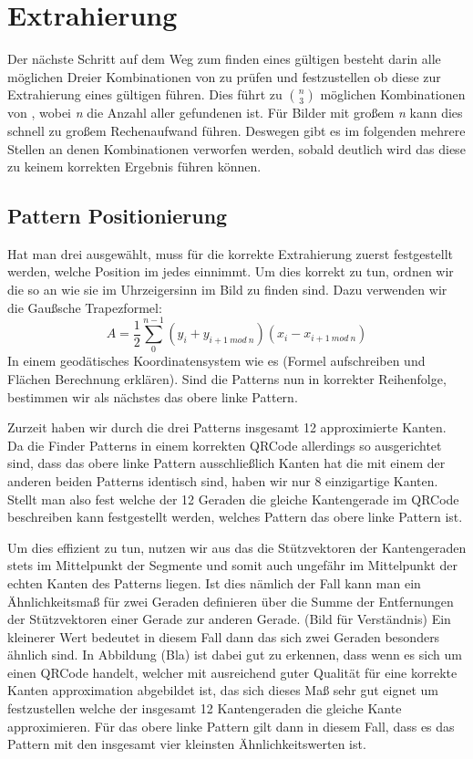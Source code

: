 \chapter{Extrahierung}

Der nächste Schritt auf dem Weg zum finden eines gültigen \QRCodes besteht darin alle möglichen Dreier Kombinationen von \fps zu prüfen und festzustellen ob diese zur Extrahierung eines gültigen \QRCodes führen. Dies führt zu $\binom{n}{3}$ möglichen Kombinationen von \fps, wobei \emph{n} die Anzahl aller gefundenen \fps ist. Für Bilder mit großem \emph{n} kann dies schnell zu großem Rechenaufwand führen. Deswegen gibt es im folgenden mehrere Stellen an denen Kombinationen verworfen werden, sobald deutlich wird das diese zu keinem korrekten Ergebnis führen können.

\section{Pattern Positionierung} 
Hat man drei \fps ausgewählt, muss für die korrekte Extrahierung zuerst festgestellt werden, welche Position im \QRCode jedes \fp einnimmt. Um dies korrekt zu tun, ordnen wir die \fps so an wie sie im Uhrzeigersinn im Bild zu finden sind. Dazu verwenden wir die Gaußsche Trapezformel:
$$ A=\frac{1}{2} \sum_{0}^{n-1} (y_i + y_{i+1\ mod\ n})(x_i - x_{i+1\ mod\ n}) $$
In einem geodätisches Koordinatensystem wie es 
 (Formel aufschreiben und Flächen Berechnung erklären). Sind die Patterns nun in korrekter Reihenfolge, bestimmen wir als nächstes das obere linke Pattern.

Zurzeit haben wir durch die drei Patterns insgesamt 12 approximierte Kanten. Da die Finder Patterns in einem korrekten QRCode allerdings so ausgerichtet sind, dass das obere linke Pattern ausschließlich Kanten hat die mit einem der anderen beiden Patterns identisch sind, haben wir nur 8 einzigartige Kanten. Stellt man also fest welche der 12 Geraden die gleiche Kantengerade im QRCode beschreiben kann festgestellt werden, welches Pattern das obere linke Pattern ist.

Um dies effizient zu tun, nutzen wir aus das die Stützvektoren der Kantengeraden stets im  Mittelpunkt der Segmente und somit auch ungefähr im Mittelpunkt der echten Kanten des Patterns liegen. Ist dies nämlich der Fall kann man ein Ähnlichkeitsmaß für zwei Geraden definieren über die Summe der Entfernungen der Stützvektoren einer Gerade zur anderen Gerade. (Bild für Verständnis) Ein kleinerer Wert bedeutet in diesem Fall dann das sich zwei Geraden besonders ähnlich sind. In Abbildung (Bla) ist dabei gut zu erkennen, dass wenn es sich um einen QRCode handelt, welcher mit ausreichend guter Qualität für eine korrekte Kanten approximation abgebildet ist, das sich dieses Maß sehr gut eignet um festzustellen welche der insgesamt 12 Kantengeraden die gleiche Kante approximieren. Für das obere linke Pattern gilt dann in diesem Fall, dass es das Pattern mit den insgesamt vier kleinsten Ähnlichkeitswerten ist.

